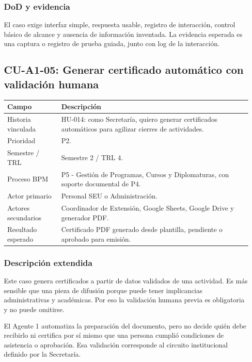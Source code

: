 \documentclass[11pt,a4paper]{article}
\begin{document}
\subsubsection{DoD y evidencia}

El caso exige interfaz simple, respuesta usable, registro de interacción, control básico de alcance y ausencia de información inventada. La evidencia esperada es una captura o registro de prueba guiada, junto con log de la interacción.

\subsection{CU-A1-05: Generar certificado automático con validación humana}

\begin{tabularx}{\textwidth}{p{}Y}
\toprule
\textbf{Campo} & \textbf{Descripción} \\
\midrule
Historia vinculada & HU-014: como Secretaría, quiero generar certificados automáticos para agilizar cierres de actividades. \\
Prioridad & P2. \\
Semestre / TRL & Semestre 2 / TRL 4. \\
Proceso BPM & P5 - Gestión de Programas, Cursos y Diplomaturas, con soporte documental de P4. \\
Actor primario & Personal SEU o Administración. \\
Actores secundarios & Coordinador de Extensión, Google Sheets, Google Drive y generador PDF. \\
Resultado esperado & Certificado PDF generado desde plantilla, pendiente o aprobado para emisión. \\
\bottomrule
\end{tabularx}

\subsubsection{Descripción extendida}

Este caso genera certificados a partir de datos validados de una actividad. Es más sensible que una pieza de difusión porque puede tener implicancias administrativas y académicas. Por eso la validación humana previa es obligatoria y no puede omitirse.

El Agente 1 automatiza la preparación del documento, pero no decide quién debe recibirlo ni certifica por sí mismo que una persona cumplió condiciones de asistencia o aprobación. Esa validación corresponde al circuito institucional definido por la Secretaría.
\end{document}
